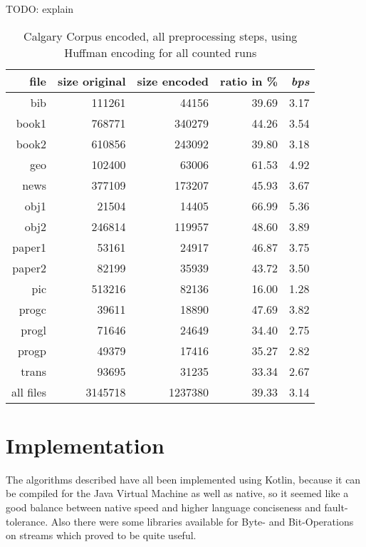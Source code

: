 {{\par{
	TODO: explain
	\begin{table}[h]
		\centering
		\begin{tabular}{r|r|r|r|r}	
			file & size original & size encoded & ratio in \% & \textit{bps}\\
			\hline
bib & 111261 & 44156 & 39.69 & 3.17 \\
book1 & 768771 & 340279 & 44.26 & 3.54 \\
book2 & 610856 & 243092 & 39.80 & 3.18 \\
geo & 102400 & 63006 & 61.53 & 4.92 \\
news & 377109 & 173207 & 45.93 & 3.67 \\
obj1 & 21504 & 14405 & 66.99 & 5.36 \\
obj2 & 246814 & 119957 & 48.60 & 3.89 \\
paper1 & 53161 & 24917 & 46.87 & 3.75 \\
paper2 & 82199 & 35939 & 43.72 & 3.50 \\
pic & 513216 & 82136 & 16.00 & 1.28 \\
progc & 39611 & 18890 & 47.69 & 3.82 \\
progl & 71646 & 24649 & 34.40 & 2.75 \\
progp & 49379 & 17416 & 35.27 & 2.82 \\
trans & 93695 & 31235 & 33.34 & 2.67 \\
			\hline
			all files & 3145718 & 1237380 & 39.33 & 3.14
		\end{tabular}
		\caption{Calgary Corpus encoded, all preprocessing steps, using Huffman encoding for all counted runs}
		\label{tab:t6:Calgary Corpus encoded, all preprocessing steps, using Huffman encoding for all counted runs}
	\end{table}
\section{Implementation}
\label{ch:Conceptual Design:sec:Implementation Decisions}

The algorithms described have all been implemented using Kotlin, because it can be compiled for the Java Virtual Machine as well as native, so it seemed like a good balance between native speed and higher language conciseness and fault-tolerance. Also there were some libraries available for Byte- and Bit-Operations on streams which proved to be quite useful.

}}}
